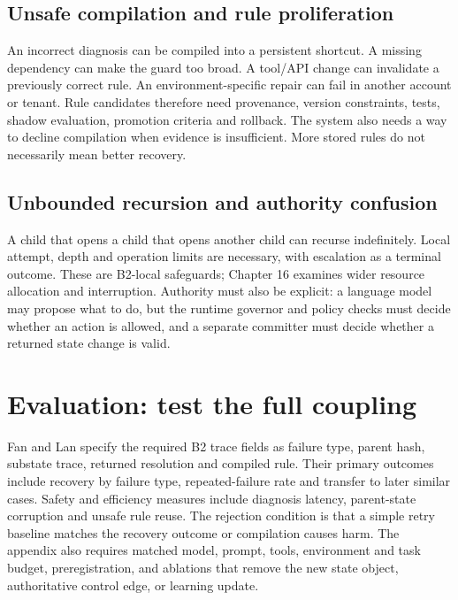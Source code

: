 \subsection{Unsafe compilation and rule proliferation}

An incorrect diagnosis can be compiled into a persistent shortcut. A missing dependency can make the guard too broad. A tool/API change can invalidate a previously correct rule. An environment-specific repair can fail in another account or tenant. Rule candidates therefore need provenance, version constraints, tests, shadow evaluation, promotion criteria and rollback. The system also needs a way to decline compilation when evidence is insufficient. More stored rules do not necessarily mean better recovery.

\subsection{Unbounded recursion and authority confusion}

A child that opens a child that opens another child can recurse indefinitely. Local attempt, depth and operation limits are necessary, with escalation as a terminal outcome. These are B2-local safeguards; Chapter 16 examines wider resource allocation and interruption. Authority must also be explicit: a language model may propose what to do, but the runtime governor and policy checks must decide whether an action is allowed, and a separate committer must decide whether a returned state change is valid.

\section{Evaluation: test the full coupling}
\label{sec:ch13-evaluation}

Fan and Lan specify the required B2 trace fields as failure type, parent hash, substate trace, returned resolution and compiled rule. Their primary outcomes include recovery by failure type, repeated-failure rate and transfer to later similar cases. Safety and efficiency measures include diagnosis latency, parent-state corruption and unsafe rule reuse. The rejection condition is that a simple retry baseline matches the recovery outcome or compilation causes harm. The appendix also requires matched model, prompt, tools, environment and task budget, preregistration, and ablations that remove the new state object, authoritative control edge, or learning update.

